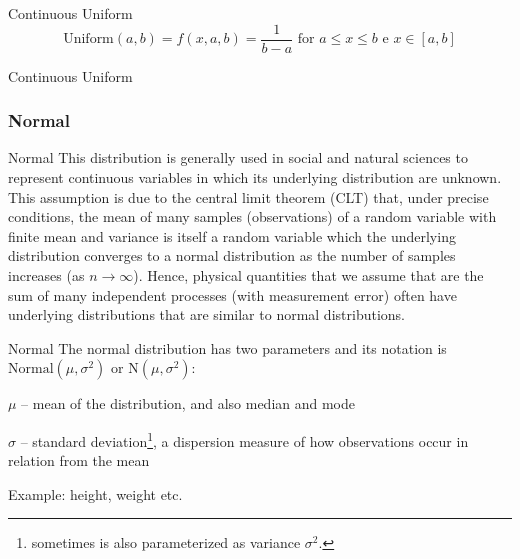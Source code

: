 \begin{frame}[noframenumbering]{Continuous Uniform}
	$$\text{Uniform}(a,b) = f(x, a, b) = \frac{1}{b-a} \text{ for $a \leq x \leq b$ e $x \in [a, b]$}$$
\end{frame}

\begin{frame}[noframenumbering]{Continuous Uniform}
	\centering
\end{frame}

\subsubsection*{Normal}
\begin{frame}[noframenumbering]{Normal}
	This distribution is generally used in social and natural sciences to
	represent continuous variables in which its underlying distribution are unknown.
	This assumption is due to the central limit theorem (CLT) that,
	under precise conditions, the mean of many samples (observations) of a
	random variable with finite mean and variance is itself a random variable
	which the underlying distribution converges to a normal distribution
	as the number of samples increases (as $n \to \infty$).
	\vfill
	Hence, physical quantities that we assume that are the sum of many
	independent processes (with measurement error) often have underlying
	distributions that are similar to normal distributions.
\end{frame}

\begin{frame}[noframenumbering]{Normal}
	The normal distribution has two parameters and its notation is
	$\text{Normal}(\mu, \sigma^2)$ or $\text{N}(\mu, \sigma^2)$:
	\begin{vfilleditems}
		\item $\mu$ -- mean of the distribution, and also median and mode
		\item $\sigma$ -- standard deviation\footnote{sometimes is also parameterized as variance $\sigma^2$.},
		a dispersion measure of how observations occur in relation from the mean
	\end{vfilleditems}
	\vfill
	Example: height, weight etc.
\end{frame}

